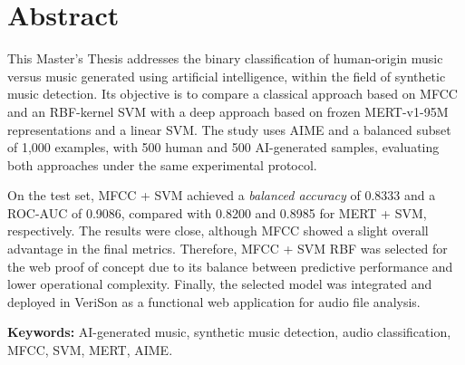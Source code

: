 \chapter*{Abstract}

This Master's Thesis addresses the binary classification of human-origin music versus music generated using artificial intelligence, within the field of synthetic music detection. Its objective is to compare a classical approach based on MFCC and an RBF-kernel SVM with a deep approach based on frozen MERT-v1-95M representations and a linear SVM. The study uses AIME and a balanced subset of 1,000 examples, with 500 human and 500 AI-generated samples, evaluating both approaches under the same experimental protocol.

On the test set, MFCC + SVM achieved a \textit{balanced accuracy} of 0.8333 and a ROC-AUC of 0.9086, compared with 0.8200 and 0.8985 for MERT + SVM, respectively. The results were close, although MFCC showed a slight overall advantage in the final metrics. Therefore, MFCC + SVM RBF was selected for the web proof of concept due to its balance between predictive performance and lower operational complexity. Finally, the selected model was integrated and deployed in VeriSon as a functional web application for audio file analysis.

\vspace{.5cm}

\textbf{Keywords:} AI-generated music, synthetic music detection, audio classification, MFCC, SVM, MERT, AIME.
